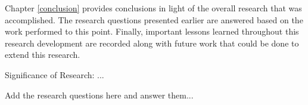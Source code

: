 
Chapter \ref{conclusion} provides conclusions in light of the overall research that was accomplished. The research questions presented earlier are answered based on the work performed to this point. Finally, important lessons learned throughout this research development are recorded along with future work that could be done to extend this research.

Significance of Research: ...

Add the research questions here and answer them...
